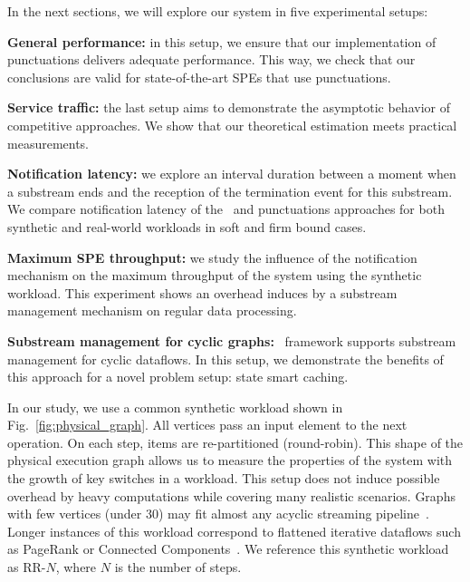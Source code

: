 In the next sections, we will explore our system in five experimental setups:
    
    \noindent \textbf{General performance:} in this setup, we ensure that our implementation of punctuations delivers adequate performance. This way, we check that our conclusions are valid for state-of-the-art SPEs that use punctuations. 
    
    \noindent \textbf{Service traffic:} the last setup aims to demonstrate the asymptotic behavior of competitive approaches. We show that our theoretical estimation meets practical measurements.
    
    \noindent \textbf{Notification latency:} we explore an interval duration between a moment when a substream ends and the reception of the termination event for this substream. We compare notification latency of the \tracker\ and punctuations approaches for both synthetic and real-world workloads in soft and firm bound cases.
    
    \noindent \textbf{Maximum SPE throughput:} we study the influence of the notification mechanism on the maximum throughput of the system using the synthetic workload. This experiment shows an overhead induces by a substream management mechanism on regular data processing.
    
    \noindent \textbf{Substream management for cyclic graphs:} \tracker\ framework supports substream management for cyclic dataflows. In this setup, we demonstrate the benefits of this approach for a novel problem setup: state smart caching.


In our study, we use a common synthetic workload shown in Fig.~\ref{fig:physical_graph}. All vertices pass an input element to the next operation. On each step, items are re-partitioned (round-robin). This shape of the physical execution graph allows us to measure the properties of the system with the growth of key switches in a workload. This setup does not induce possible overhead by heavy computations while covering many realistic scenarios. Graphs with few vertices (under 30) may fit almost any acyclic streaming pipeline~\cite{akidau2018streaming}. Longer instances of this workload correspond to flattened iterative dataflows such as PageRank or Connected Components~\cite{Murray:2013:NTD:2517349.2522738, xu2016efficient}. We reference this synthetic workload as RR-$N$, where $N$ is the number of steps.

